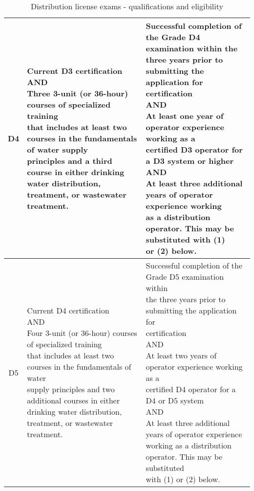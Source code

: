 \begin{table}[H]
\begin{tabular}{|c|p{7.1cm}|p{7cm}|}
D4    & \makecell[l]{Current D3 certification\\ AND \\Three 3-unit (or 36-hour) courses of specialized training\\that includes at least two courses in the fundamentals of water supply\\ principles and a third course in either drinking water distribution,\\treatment, or wastewater treatment.}& \makecell[l]{Successful completion of the Grade   D4 examination within the \\three years prior to submitting the application for certification\\ AND\\ At least one year of operator experience working as a\\certified D3 operator for a D3 system or higher\\ AND\\ At least three additional years of operator experience working\\as a distribution operator. This may be substituted with (1)\\or (2) below.}\\ \hline
D5    & \makecell[l]{Current D4 certification\\AND\\Four 3-unit (or 36-hour) courses of specialized training\\ that includes at least two courses in the fundamentals of water\\supply principles and two additional courses in either\\ drinking water distribution, treatment, or wastewater treatment.} & \makecell[l]{Successful completion of the Grade D5 examination within\\the three years prior to submitting the application for\\certification\\AND\\At least two years of operator experience working as a\\certified D4 operator for a D4 or D5 system\\AND\\At least three additional years of operator experience\\working as a distribution operator. This may be substituted\\with (1) or (2) below.}\\ \hline
\end{tabular}
\caption{Distribution license exams - qualifications and eligibility}
\end{table}

